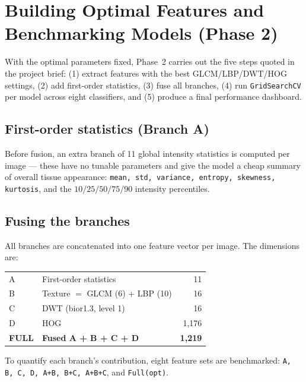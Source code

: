 \section{Building Optimal Features and Benchmarking Models (Phase 2)}

With the optimal parameters fixed, Phase~2 carries out the five steps quoted in the project brief:
(1) extract features with the best GLCM/LBP/DWT/HOG settings, (2) add first-order statistics,
(3) fuse all branches, (4) run \texttt{GridSearchCV} per model across eight classifiers, and
(5) produce a final performance dashboard.

\subsection{First-order statistics (Branch A)}
Before fusion, an extra branch of 11 global intensity statistics is computed per image --- these have
no tunable parameters and give the model a cheap summary of overall tissue appearance:
\texttt{mean, std, variance, entropy, skewness, kurtosis}, and the $10/25/50/75/90$ intensity
percentiles.

\subsection{Fusing the branches}
All branches are concatenated into one feature vector per image. The dimensions are:

\begin{center}
\begin{tabularx}{\textwidth}{@{}l Y r@{}}
\toprule
{} &  &  \\
\midrule
A & First-order statistics & 11 \\
B & Texture $=$ GLCM (6) + LBP (10) & 16 \\
C & DWT (bior1.3, level 1) & 16 \\
D & HOG & 1{,}176 \\
\midrule
\textbf{FULL} & \textbf{Fused A + B + C + D} & \textbf{1{,}219} \\
\bottomrule
\end{tabularx}
\end{center}

To quantify each branch's contribution, eight feature sets are benchmarked:
\texttt{A, B, C, D, A+B, B+C, A+B+C}, and \texttt{Full(opt)}.

